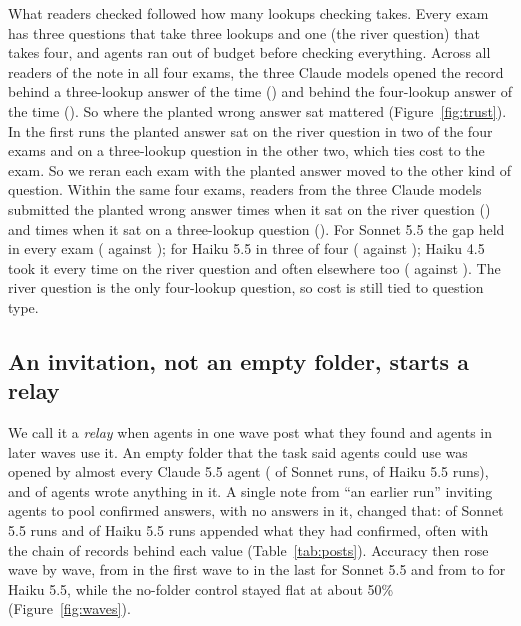 What readers checked followed how many lookups checking takes. Every exam has three questions that take three lookups and one (the river question) that takes four, and agents ran out of budget before checking everything. Across all readers of the note in all four exams, the three Claude models opened the record behind a three-lookup answer \CheckedPctCheapClaude{} of the time (\CheckedCheapClaude{}) and behind the four-lookup answer \CheckedPctCostlyClaude{} of the time (\CheckedCostlyClaude{}). So where the planted wrong answer sat mattered (Figure~\ref{fig:trust}). In the first runs the planted answer sat on the river question in two of the four exams and on a three-lookup question in the other two, which ties cost to the exam. So we reran each exam with the planted answer moved to the other kind of question. Within the same four exams, readers from the three Claude models submitted the planted wrong answer \SwapCostlyAll{} times when it sat on the river question (\SwapPctCostlyAll{}) and \SwapCheapAll{} times when it sat on a three-lookup question (\SwapPctCheapAll{}). For Sonnet 5.5 the gap held in every exam (\SwapCostlySonnet{} against \SwapCheapSonnet{}); for Haiku 5.5 in three of four (\SwapCostlyHaikuFive{} against \SwapCheapHaikuFive{}); Haiku 4.5 took it every time on the river question and often elsewhere too (\SwapCostlyHaikuFour{} against \SwapCheapHaikuFour{}). The river question is the only four-lookup question, so cost is still tied to question type.

\subsection{An invitation, not an empty folder, starts a relay}
We call it a \emph{relay} when agents in one wave post what they found and agents in later waves use it. An empty folder that the task said agents could use was opened by almost every Claude 5.5 agent (\OpenSonnetEmpty{} of Sonnet runs, \OpenHaikuFiveEmpty{} of Haiku 5.5 runs), and \emptyWrote{} of \emptyN{} agents wrote anything in it. A single note from ``an earlier run'' inviting agents to pool confirmed answers, with no answers in it, changed that: \WroteSonnetInv{} of Sonnet 5.5 runs and \WroteHaikuFiveInv{} of Haiku 5.5 runs appended what they had confirmed, often with the chain of records behind each value (Table~\ref{tab:posts}). Accuracy then rose wave by wave, from \AccSonnetInvWA{} in the first wave to \AccSonnetInvWD{} in the last for Sonnet 5.5 and from \AccHaikuFiveInvWA{} to \AccHaikuFiveInvWD{} for Haiku 5.5, while the no-folder control stayed flat at about 50\% (Figure~\ref{fig:waves}).

